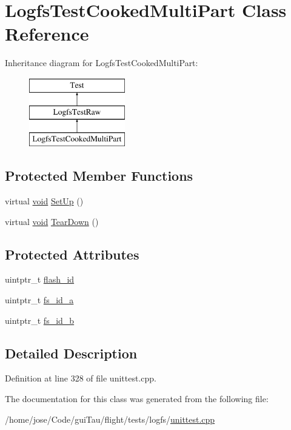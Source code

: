 \hypertarget{class_logfs_test_cooked_multi_part}{\section{Logfs\-Test\-Cooked\-Multi\-Part Class Reference}
\label{class_logfs_test_cooked_multi_part}
}
Inheritance diagram for Logfs\-Test\-Cooked\-Multi\-Part\-:\begin{figure}[H]
\begin{center}
\leavevmode
\includegraphics[height=3.000000cm]{class_logfs_test_cooked_multi_part}
\end{center}
\end{figure}
\subsection*{Protected Member Functions}
\begin{DoxyCompactItemize}
\item 
virtual \hyperlink{group___n_a_m_e_ga18028b8badbf1ea7e704ccac3c488e82}{void} \hyperlink{group___unit_tests_ga6143b6807b4ed29675a12d317dda0b87}{Set\-Up} ()
\item 
virtual \hyperlink{group___n_a_m_e_ga18028b8badbf1ea7e704ccac3c488e82}{void} \hyperlink{group___unit_tests_ga5031a2adb8db0e1125f0f2f2e5d0c82b}{Tear\-Down} ()
\end{DoxyCompactItemize}
\subsection*{Protected Attributes}
\begin{DoxyCompactItemize}
\item 
uintptr\-\_\-t \hyperlink{group___unit_tests_ga503c4ee9ad8abab85d6fb34d0397944c}{flash\-\_\-id}
\item 
uintptr\-\_\-t \hyperlink{group___unit_tests_gadeab2644468b89d495d396f0e55524e6}{fs\-\_\-id\-\_\-a}
\item 
uintptr\-\_\-t \hyperlink{group___unit_tests_ga2398cf58e337f70603e12a997936f0c9}{fs\-\_\-id\-\_\-b}
\end{DoxyCompactItemize}


\subsection{Detailed Description}


Definition at line 328 of file unittest.\-cpp.



The documentation for this class was generated from the following file\-:\begin{DoxyCompactItemize}
\item 
/home/jose/\-Code/gui\-Tau/flight/tests/logfs/\hyperlink{logfs_2unittest_8cpp}{unittest.\-cpp}\end{DoxyCompactItemize}
